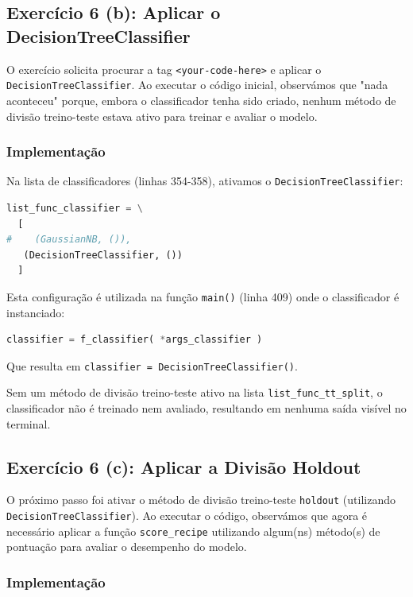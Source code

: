 \documentclass[12pt,a4paper]{article}
\begin{document}
\subsection{Exercício 6 (b): Aplicar o DecisionTreeClassifier}

O exercício solicita procurar a tag \texttt{<your-code-here>} e aplicar o \texttt{DecisionTreeClassifier}. Ao executar o código inicial, observámos que "nada aconteceu" porque, embora o classificador tenha sido criado, nenhum método de divisão treino-teste estava ativo para treinar e avaliar o modelo.

\subsubsection{Implementação}

Na lista de classificadores (linhas 354-358), ativamos o \texttt{DecisionTreeClassifier}:
\begin{lstlisting}[language=Python]
list_func_classifier = \
  [
#    (GaussianNB, ()),
   (DecisionTreeClassifier, ())
  ]
\end{lstlisting}

Esta configuração é utilizada na função \texttt{main()} (linha 409) onde o classificador é instanciado:
\begin{lstlisting}[language=Python]
classifier = f_classifier( *args_classifier )
\end{lstlisting}

Que resulta em \texttt{classifier = DecisionTreeClassifier()}.

Sem um método de divisão treino-teste ativo na lista \texttt{list\_func\_tt\_split}, o classificador não é treinado nem avaliado, resultando em nenhuma saída visível no terminal.

\subsection{Exercício 6 (c): Aplicar a Divisão Holdout}

O próximo passo foi ativar o método de divisão treino-teste \texttt{holdout} (utilizando \texttt{DecisionTreeClassifier}). Ao executar o código, observámos que agora é necessário aplicar a função \texttt{score\_recipe} utilizando algum(ns) método(s) de pontuação para avaliar o desempenho do modelo.

\subsubsection{Implementação}
\end{document}
